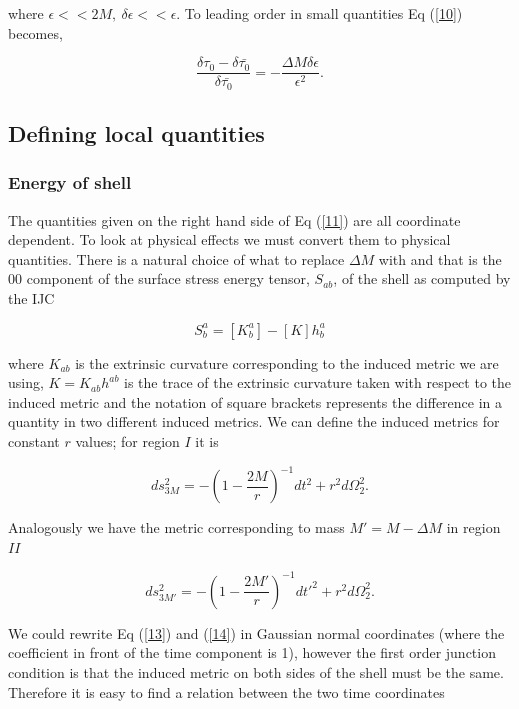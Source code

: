 \documentclass[aps,showpacs,onecolumn,floats,prd,superscriptaddress,nofootinbib]{revtex4}
\begin{document}
where $\epsilon<<2M, \ \delta \epsilon << \epsilon$. To leading order in small quantities Eq (\ref{10}) becomes, 

\begin{equation}
	\frac{\delta \tau_0 - \delta \bar{\tau_0}}{\delta \bar{\tau_0}} = - \frac{\Delta M \delta \epsilon}{\epsilon^2}.	\label{11}
\end{equation}

\subsection{Defining local quantities}

\subsubsection{Energy of shell}

The quantities given on the right hand side of Eq (\ref{11}) are all coordinate dependent. To look at physical effects we must convert them to physical quantities. There is a natural choice of what to replace $\Delta M$ with and that is the $00$ component of the surface stress energy tensor, $S_{ab}$, of the shell as computed by the IJC

\begin{equation}
	S^a_b =  [K^a_b] - [K]h^a_b
\end{equation}

where $K_{ab}$ is the extrinsic curvature corresponding to the induced metric we are using, $K = K_{ab} h^{ab}$ is the trace of the extrinsic curvature taken with respect to the induced metric and the notation of square brackets represents the difference in a quantity in two different induced metrics. We can define the induced metrics for constant $r$ values; for region $I$ it is 

\begin{equation}
	ds_{3M}^2 = - \left( 1 - \frac{2M}{r} \right)^{-1} dt^2 + r^2 d \Omega_2^2.	\label{13}
\end{equation}

Analogously we have the metric corresponding to mass $M' = M- \Delta M$ in region $II$

\begin{equation}
	ds_{3M'}^2 = - \left( 1 - \frac{2M'}{r} \right)^{-1} dt'^2 + r^2 d \Omega_2^2.	\label{14}
\end{equation}

We could rewrite Eq (\ref{13}) and (\ref{14}) in Gaussian normal coordinates (where the coefficient in front of the time component is 1), however the first order junction condition is that the induced metric on both sides of the shell must be the same. Therefore it is easy to find a relation between the two time coordinates
\end{document}
